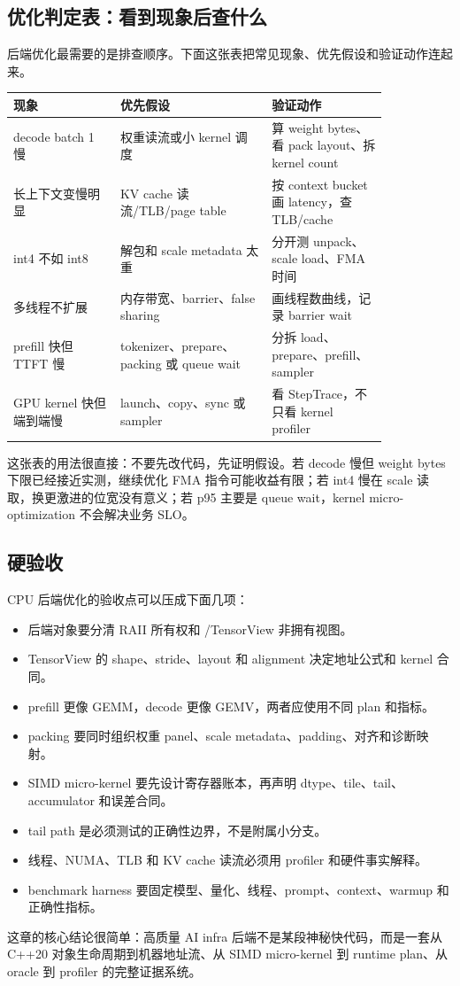 \subsection{优化判定表：看到现象后查什么}

后端优化最需要的是排查顺序。下面这张表把常见现象、优先假设和验证动作连起来。

\begin{center}
\begin{tabular}{p{0.24\linewidth}p{0.34\linewidth}p{0.26\linewidth}}
\toprule
现象 & 优先假设 & 验证动作 \\
\midrule
decode batch 1 慢 & 权重读流或小 kernel 调度 & 算 weight bytes、看 pack layout、拆 kernel count \\
长上下文变慢明显 & KV cache 读流/TLB/page table & 按 context bucket 画 latency，查 TLB/cache \\
int4 不如 int8 & 解包和 scale metadata 太重 & 分开测 unpack、scale load、FMA 时间 \\
多线程不扩展 & 内存带宽、barrier、false sharing & 画线程数曲线，记录 barrier wait \\
prefill 快但 TTFT 慢 & tokenizer、prepare、packing 或 queue wait & 分拆 load、prepare、prefill、sampler \\
GPU kernel 快但端到端慢 & launch、copy、sync 或 sampler & 看 StepTrace，不只看 kernel profiler \\
\bottomrule
\end{tabular}
\end{center}

这张表的用法很直接：不要先改代码，先证明假设。若 decode 慢但 weight bytes 下限已经接近实测，继续优化 FMA 指令可能收益有限；若 int4 慢在 scale 读取，换更激进的位宽没有意义；若 p95 主要是 queue wait，kernel micro-optimization 不会解决业务 SLO。

\subsection{硬验收}

CPU 后端优化的验收点可以压成下面几项：

\begin{itemize}
  \item 后端对象要分清 RAII 所有权和 /TensorView 非拥有视图。
  \item TensorView 的 shape、stride、layout 和 alignment 决定地址公式和 kernel 合同。
  \item prefill 更像 GEMM，decode 更像 GEMV，两者应使用不同 plan 和指标。
  \item packing 要同时组织权重 panel、scale metadata、padding、对齐和诊断映射。
  \item SIMD micro-kernel 要先设计寄存器账本，再声明 dtype、tile、tail、accumulator 和误差合同。
  \item tail path 是必须测试的正确性边界，不是附属小分支。
  \item 线程、NUMA、TLB 和 KV cache 读流必须用 profiler 和硬件事实解释。
  \item benchmark harness 要固定模型、量化、线程、prompt、context、warmup 和正确性指标。
\end{itemize}

这章的核心结论很简单：高质量 AI infra 后端不是某段神秘快代码，而是一套从 C++20 对象生命周期到机器地址流、从 SIMD micro-kernel 到 runtime plan、从 oracle 到 profiler 的完整证据系统。
